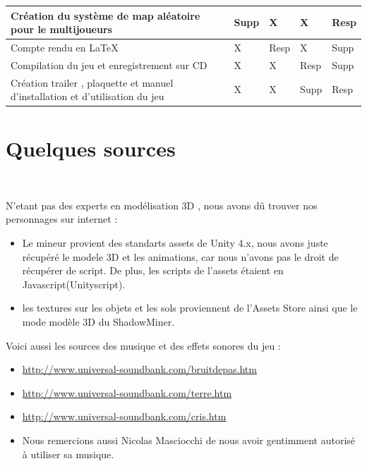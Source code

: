 \documentclass[titlepage, 13px, a4paper]{report}
\begin{document}
{\begin{tabular}{|p{6cm}|p{1.2cm}|p{1.2cm}|p{1.2cm}|p{1.2cm}|}
		\hline
		Création du système de map aléatoire pour le multijoueurs & Supp\footnotemark[2] & X & X & Resp\footnotemark[1] \\
		\hline
		Compte rendu en \LaTeX & X & Resp\footnotemark[1] & X & Supp\footnotemark[2]  \\
		\hline
		Compilation du jeu et enregistrement sur CD & X & X & Resp\footnotemark[1] & Supp\footnotemark[2] \\
		\hline
		Création trailer , plaquette et manuel d'installation et d'utilisation du jeu & X & X & Supp\footnotemark[2] & Resp\footnotemark[1] \\
		\hline
	\end{tabular}
	\label{repartition}		
}





\newpage
{}
\part{Quelques sources}
\paragraph{} \hspace{0pt} \\ 
N'etant pas des experts en modélisation 3D , nous avons dû trouver nos personnages sur internet : 
{\begin{itemize}
	\item Le mineur provient des standarts assets de Unity 4.x, nous avons juste récupéré le modele 3D et les animations, 
	car nous n'avons pas le droit de récupérer de script. De plus, les scripts de l'assets étaient en Javascript(Unityscript).
	\item les textures sur les objets et les sols proviennent de l'Assets Store ainsi que le mode modèle 3D du ShadowMiner. \\
\end{itemize}} 

Voici aussi les sources des musique et des effets sonores du jeu : \\
{\begin{itemize}
	\item \url{http://www.universal-soundbank.com/bruitdepas.htm}
	\item \url{http://www.universal-soundbank.com/terre.htm}
	\item \url{http://www.universal-soundbank.com/cris.htm}
	\item Nous remercions aussi Nicolas Masciocchi de nous avoir gentimment autorisé à utiliser sa musique.
\end{itemize}} 
\end{document}
